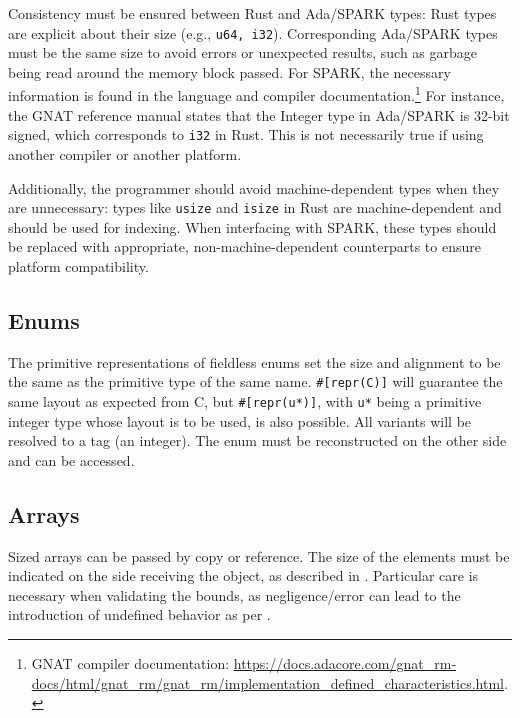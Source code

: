 \documentclass[nomenclature, english, bibtex]{kththesis}
\begin{document}
Consistency must be ensured between Rust and Ada/SPARK types: Rust types are explicit about their size (e.g., \texttt{u64, i32}). Corresponding Ada/SPARK types must be the same size to avoid errors or unexpected results, such as garbage being read around the memory block passed. For SPARK, the necessary information is found in the language and compiler documentation.\footnote{GNAT compiler documentation: \url{https://docs.adacore.com/gnat_rm-docs/html/gnat_rm/gnat_rm/implementation_defined_characteristics.html}.}
For instance, the GNAT reference manual states that the Integer type in Ada/SPARK is 32-bit signed, which corresponds to \texttt{i32} in Rust. This is not necessarily true if using another compiler or another platform.

Additionally, the programmer should avoid machine-dependent types when they are unnecessary: types like \texttt{usize} and \texttt{isize} in Rust are machine-dependent and should be used for indexing. When interfacing with SPARK, these types should be replaced with appropriate, non-machine-dependent counterparts to ensure platform compatibility.

\subsection{Enums}

The primitive representations of fieldless enums set the size and alignment to be the same as the primitive type of the same name. \texttt{\#[repr(C)]} will guarantee the same layout as expected from C, but \texttt{\#[repr(u*)]}, with \texttt{u*} being a primitive integer type whose layout is to be used, is also possible. All variants will be resolved to a tag (an integer). The enum must be reconstructed on the other side and can be accessed.

\subsection{Arrays}

Sized arrays can be passed by copy or reference. The size of the elements must be indicated on the side receiving the object, as described in . Particular care is necessary when validating the bounds, as negligence/error can lead to the introduction of undefined behavior as per .
\end{document}
